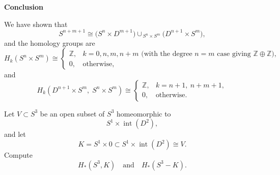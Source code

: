 \begin{solution}
\medskip
\noindent\textbf{Conclusion}\par
\smallskip


We have shown that
\[
S^{n+m+1}
\cong
\bigl(S^n \times D^{m+1}\bigr)\cup_{\,S^n \times S^m}\bigl(D^{n+1} \times S^m\bigr),
\]
and the homology groups are
\[
H_k(S^n \times S^m)\cong
\begin{cases}
	\mathbb Z, & k=0,n,m,n+m
	\text{ (with the degree \(n=m\) case giving } \mathbb Z\oplus\mathbb Z\text{)},\\
	0, & \text{otherwise},
\end{cases}
\]
and
\[
H_k(D^{n+1} \times S^m,\; S^n \times S^m)
\cong
\begin{cases}
	\mathbb Z, & k=n+1,\ n+m+1,\\
	0, & \text{otherwise}.
\end{cases}
\]
\end{solution}

\begin{problem}
Let \(V \subset S^3\) be an open subset of \(S^3\) homeomorphic to
\[
S^1 \times \operatorname{int}(D^2),
\]
and let
\[
K=S^1 \times 0 \subset S^1 \times \operatorname{int}(D^2)\cong V.
\]
Compute
\[
H_*(S^3,K)
\quad\text{and}\quad
H_*(S^3-K).
\]
\end{problem}

